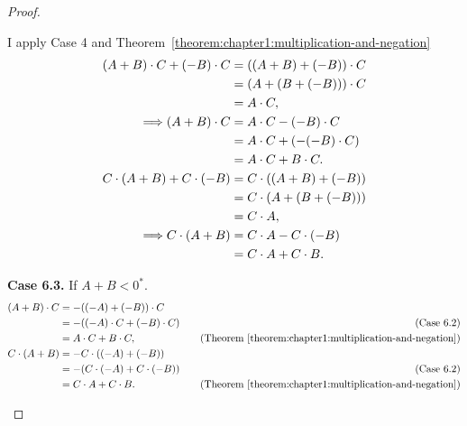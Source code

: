 \begin{proof}
\begin{enumerate}[label={(F\arabic*)}, start=5]
              I apply Case 4 and Theorem~\ref{theorem:chapter1:multiplication-and-negation}
              {\allowdisplaybreaks{}
                  \begin{align*}
                      (A + B)\cdot C + (-B)\cdot C   & = ((A + B) + (-B))\cdot C   \\
                                                     & = (A + (B + (-B)))\cdot C   \\
                                                     & = A\cdot C,                 \\
                      \Longrightarrow (A + B)\cdot C & = A\cdot C - (-B)\cdot C    \\
                                                     & = A\cdot C + (-(-B)\cdot C) \\
                                                     & = A\cdot C + B\cdot C.      \\
                      \bigskip
                      C\cdot (A + B) + C\cdot (-B)   & = C\cdot ((A + B) + (-B))   \\
                                                     & = C\cdot (A + (B + (-B)))   \\
                                                     & = C\cdot A,                 \\
                      \Longrightarrow C\cdot (A + B) & = C\cdot A - C\cdot (-B)    \\
                                                     & = C\cdot A + C\cdot B.
                  \end{align*}}

              \textbf{Case 6.3.} If $A + B < {0}^{*}$.
                  {\allowdisplaybreaks{}
                      \begin{align*}
                          (A + B)\cdot C & = -((-A) + (-B))\cdot C                                                                                   \\
                                         & = -((-A)\cdot C + (-B)\cdot C) & \quad\text{(Case 6.2)}                                                   \\
                                         & = A\cdot C + B\cdot C,         & \quad\text{(Theorem~\ref{theorem:chapter1:multiplication-and-negation})} \\
                          C\cdot (A + B) & = -C\cdot ((-A) + (-B))                                                                                   \\
                                         & = -(C\cdot (-A) + C\cdot (-B)) & \quad\text{(Case 6.2)}                                                   \\
                                         & = C\cdot A + C\cdot B.         & \quad\text{(Theorem~\ref{theorem:chapter1:multiplication-and-negation})}
                      \end{align*}}


\end{enumerate}
\end{proof}
